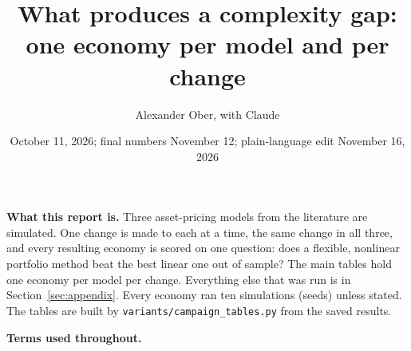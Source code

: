 \documentclass[11pt]{article}
\title{What produces a complexity gap:\\one economy per model and per change}
\author{Alexander Ober, with Claude}
\date{October 11, 2026; final numbers November 12; plain-language edit November 16, 2026}
\begin{document}
\maketitle


\textbf{What this report is.} Three asset-pricing models from the literature are simulated. One change is made to each at a time, the same change in all three, and every resulting economy is scored on one question: does a flexible, nonlinear portfolio method beat the best linear one out of sample? The main tables hold one economy per model per change. Everything else that was run is in Section~\ref{sec:appendix}. Every economy ran ten simulations (seeds) unless stated. The tables are built by \texttt{variants/campaign\_tables.py} from the saved results.

\textbf{Terms used throughout.}
\end{document}
